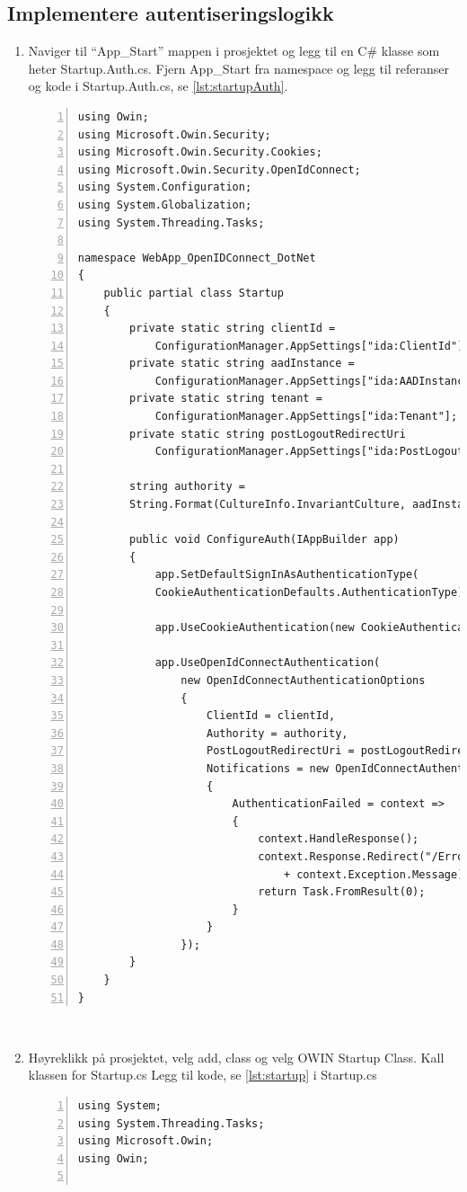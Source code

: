 \subsection*{Implementere autentiseringslogikk}

\begin{enumerate}
\item Naviger til “App\_Start” mappen i prosjektet og legg til en C\# klasse som heter Startup.Auth.cs. Fjern App\_Start fra namespace og legg til referanser og kode i Startup.Auth.cs, se \ref{lst:startupAuth}. 
\begin{lstlisting}[captionpos=b, caption={Startup.Auth.cs},label={lst:startupAuth},numbers=left]
        using Owin;
using Microsoft.Owin.Security;
using Microsoft.Owin.Security.Cookies;
using Microsoft.Owin.Security.OpenIdConnect;
using System.Configuration;
using System.Globalization;
using System.Threading.Tasks;

namespace WebApp_OpenIDConnect_DotNet
{
    public partial class Startup
    {
        private static string clientId = 
            ConfigurationManager.AppSettings["ida:ClientId"];
        private static string aadInstance = 
            ConfigurationManager.AppSettings["ida:AADInstance"];
        private static string tenant = 
            ConfigurationManager.AppSettings["ida:Tenant"];
        private static string postLogoutRedirectUri
            ConfigurationManager.AppSettings["ida:PostLogoutRedirectUri"];

        string authority = 
        String.Format(CultureInfo.InvariantCulture, aadInstance, tenant);

        public void ConfigureAuth(IAppBuilder app)
        {
            app.SetDefaultSignInAsAuthenticationType(
            CookieAuthenticationDefaults.AuthenticationType);

            app.UseCookieAuthentication(new CookieAuthenticationOptions());

            app.UseOpenIdConnectAuthentication(
                new OpenIdConnectAuthenticationOptions
                {
                    ClientId = clientId,
                    Authority = authority,
                    PostLogoutRedirectUri = postLogoutRedirectUri,
                    Notifications = new OpenIdConnectAuthenticationNotifications
                    {
                        AuthenticationFailed = context => 
                        {
                            context.HandleResponse();
                            context.Response.Redirect("/Error?message="
                                + context.Exception.Message);
                            return Task.FromResult(0);
                        }
                    }
                });
        }
    }
}
\end{lstlisting}
\\
\item Høyreklikk på prosjektet, velg add, class og velg OWIN Startup Class. Kall klassen for Startup.cs Legg til kode, se \ref{lst:startup} i Startup.cs
\begin{lstlisting}[captionpos=b, caption={Startup.cs},label={lst:startup},numbers=left]
using System;
using System.Threading.Tasks;
using Microsoft.Owin;
using Owin;


\end{lstlisting}
\end{enumerate}
